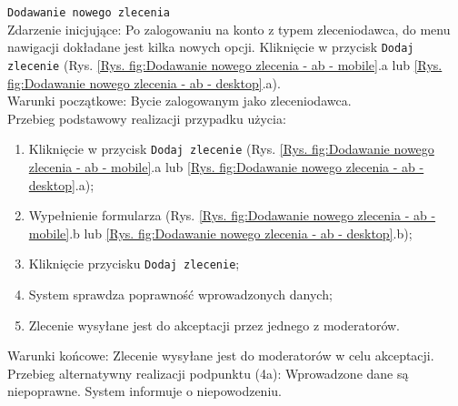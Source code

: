 \texttt{Dodawanie nowego zlecenia} \\
Zdarzenie inicjujące: Po zalogowaniu na konto z typem zleceniodawca, do menu nawigacji dokładane jest kilka nowych opcji. Kliknięcie w przycisk \texttt{Dodaj zlecenie} (Rys. \ref{Rys. fig:Dodawanie nowego zlecenia - ab - mobile}.a lub \ref{Rys. fig:Dodawanie nowego zlecenia - ab - desktop}.a). \\
Warunki początkowe: Bycie zalogowanym jako zleceniodawca. \\
Przebieg podstawowy realizacji przypadku użycia:
\begin{enumerate}
    \item Kliknięcie w przycisk \texttt{Dodaj zlecenie} (Rys. \ref{Rys. fig:Dodawanie nowego zlecenia - ab - mobile}.a lub \ref{Rys. fig:Dodawanie nowego zlecenia - ab - desktop}.a);
    \item Wypełnienie formularza (Rys. \ref{Rys. fig:Dodawanie nowego zlecenia - ab - mobile}.b lub \ref{Rys. fig:Dodawanie nowego zlecenia - ab - desktop}.b);
    \item Kliknięcie przycisku \texttt{Dodaj zlecenie};
    \item System sprawdza poprawność wprowadzonych danych;
    \item Zlecenie wysyłane jest do akceptacji przez jednego z moderatorów.
\end{enumerate}
Warunki końcowe: Zlecenie wysyłane jest do moderatorów w celu akceptacji.
Przebieg alternatywny realizacji podpunktu (4a): Wprowadzone dane są niepoprawne. System informuje o niepowodzeniu. \\
